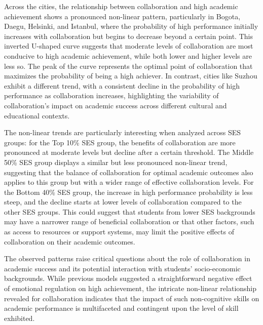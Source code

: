 \documentclass[
  12pt,
  a4paper,
]{article}
\begin{document}
Across the cities, the relationship between collaboration and high
academic achievement shows a pronounced non-linear pattern, particularly
in Bogota, Daegu, Helsinki, and Istanbul, where the probability of high
performance initially increases with collaboration but begins to
decrease beyond a certain point. This inverted U-shaped curve suggests
that moderate levels of collaboration are most conducive to high
academic achievement, while both lower and higher levels are less so.
The peak of the curve represents the optimal point of collaboration that
maximizes the probability of being a high achiever. In contrast, cities
like Suzhou exhibit a different trend, with a consistent decline in the
probability of high performance as collaboration increases, highlighting
the variability of collaboration's impact on academic success across
different cultural and educational contexts.

The non-linear trends are particularly interesting when analyzed across
SES groups: for the Top 10\% SES group, the benefits of collaboration
are more pronounced at moderate levels but decline after a certain
threshold. The Middle 50\% SES group displays a similar but less
pronounced non-linear trend, suggesting that the balance of
collaboration for optimal academic outcomes also applies to this group
but with a wider range of effective collaboration levels. For the Bottom
40\% SES group, the increase in high performance probability is less
steep, and the decline starts at lower levels of collaboration compared
to the other SES groups. This could suggest that students from lower SES
backgrounds may have a narrower range of beneficial collaboration or
that other factors, such as access to resources or support systems, may
limit the positive effects of collaboration on their academic outcomes.

The observed patterns raise critical questions about the role of
collaboration in academic success and its potential interaction with
students' socio-economic backgrounds. While previous models suggested a
straightforward negative effect of emotional regulation on high
achievement, the intricate non-linear relationship revealed for
collaboration indicates that the impact of such non-cognitive skills on
academic performance is multifaceted and contingent upon the level of
skill exhibited.
\end{document}
